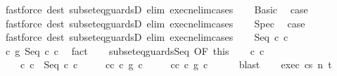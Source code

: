 \begin{isabellebody}
\ {\isacharparenleft}fastforce\ dest{\isacharcolon}\ subseteq{\isacharunderscore}guardsD\ elim{\isacharcolon}\ execn{\isacharunderscore}elim{\isacharunderscore}cases{\isacharparenright}\isanewline
{}\isamarkupfalse%
\isanewline
\ \ \isamarkupfalse%
\ Basic\ \isamarkupfalse%
\ {\isacharquery}case\ \isanewline
\ \ \ \ \isamarkupfalse%
\ {\isacharparenleft}fastforce\ dest{\isacharcolon}\ subseteq{\isacharunderscore}guardsD\ elim{\isacharcolon}\ execn{\isacharunderscore}elim{\isacharunderscore}cases{\isacharparenright}\isanewline
{}\isamarkupfalse%
\isanewline
\ \ \isamarkupfalse%
\ Spec\ \isamarkupfalse%
\ {\isacharquery}case\ \isanewline
\ \ \ \ \isamarkupfalse%
\ {\isacharparenleft}fastforce\ dest{\isacharcolon}\ subseteq{\isacharunderscore}guardsD\ elim{\isacharcolon}\ execn{\isacharunderscore}elim{\isacharunderscore}cases{\isacharparenright}\isanewline
{}\isamarkupfalse%
\isanewline
\ \ \isamarkupfalse%
\ {\isacharparenleft}Seq\ c{}{\isacharprime}\ c{}{\isacharprime}{\isacharparenright}\isanewline
\ \ \isamarkupfalse%
\ {\isachardoublequoteopen}c\ {\isasymsubseteq}\isactrlsub g\ Seq\ c{}{\isacharprime}\ c{}{\isacharprime}{\isachardoublequoteclose}\ \isamarkupfalse%
\ fact\isanewline
\ \ \isamarkupfalse%
\ subseteq{\isacharunderscore}guards{\isacharunderscore}Seq\ {\isacharbrackleft}OF\ this{\isacharbrackright}\isanewline
\ \ \isamarkupfalse%
\ c{}\ c{}\ \ \isanewline
\ \ \ \ c{\isacharcolon}\ {\isachardoublequoteopen}c\ {\isacharequal}\ Seq\ c{}\ c{}{\isachardoublequoteclose}\ \isanewline
\ \ \ \ c{}{\isacharunderscore}c{}{\isacharprime}{\isacharcolon}\ {\isachardoublequoteopen}c{}\ {\isasymsubseteq}\isactrlsub g\ c{}{\isacharprime}{\isachardoublequoteclose}\ \isanewline
\ \ \ \ c{}{\isacharunderscore}c{}{\isacharprime}{\isacharcolon}\ {\isachardoublequoteopen}c{}\ {\isasymsubseteq}\isactrlsub g\ c{}{\isacharprime}{\isachardoublequoteclose}\isanewline
\ \ \ \ \isamarkupfalse%
\ blast\isanewline
\ \ \isamarkupfalse%
\ exec{\isacharcolon}\ {\isachardoublequoteopen}{\isasymGamma}{\isasymturnstile}{\isasymlangle}c{\isacharcomma}s{\isasymrangle}\ {\isacharequal}n{\isasymRightarrow}\ t{\isachardoublequoteclose}\ \isamarkupfalse%

\end{isabellebody}
